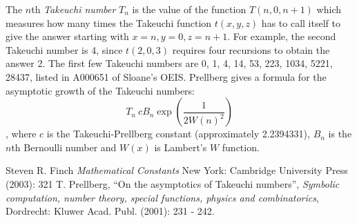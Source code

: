 \documentclass[12pt]{article}
\begin{document}
The $n$th {\em Takeuchi number} $T_n$ is the value of the function $T(n, 0, n + 1)$ which measures how many times the Takeuchi function $t(x, y, z)$ has to call itself to give the answer starting with $x = n, y = 0, z = n + 1$. For example, the second Takeuchi number is 4, since $t(2, 0, 3)$ requires four recursions to obtain the answer 2. The first few Takeuchi numbers are 0, 1, 4, 14, 53, 223, 1034, 5221, 28437, listed in A000651 of Sloane's OEIS. Prellberg gives a formula for the asymptotic growth of the Takeuchi numbers: $$T_n ~ cB_n\exp\left(\frac{1}{2W(n)^2}\right)$$, where $c$ is the Takeuchi-Prellberg constant (approximately 2.2394331), $B_n$ is the $n$th Bernoulli number and $W(x)$ is Lambert's $W$ function.

\begin{thebibliography}{2}
 Steven R. Finch {\it Mathematical Constants} New York: Cambridge University Press (2003): 321
 T. Prellberg, ``On the asymptotics of Takeuchi numbers'', {\it Symbolic computation, number theory, special functions, physics and combinatorics}, Dordrecht: Kluwer Acad. Publ. (2001): 231 - 242.
\end{thebibliography}
\end{document}
